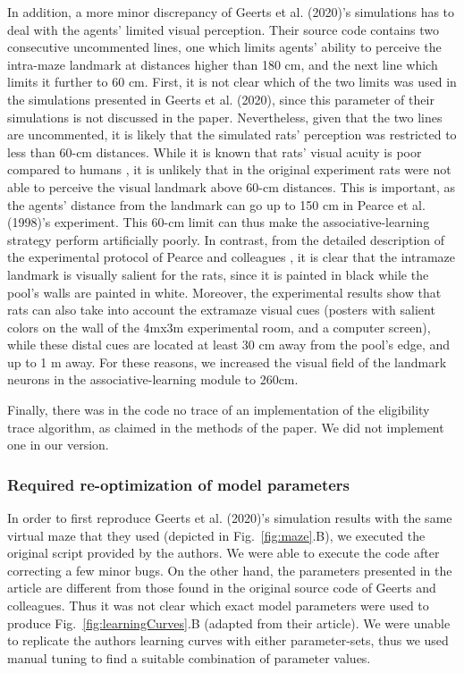 In addition, a more minor discrepancy of Geerts et al. (2020)'s simulations has to deal with the agents' limited visual perception. Their source code contains two consecutive uncommented lines, one which limits agents' ability to perceive the intra-maze landmark at distances higher than 180 cm, and the next line which limits it further to 60 cm. First, it is not clear which of the two limits was used in the simulations presented in Geerts et al. (2020), since this parameter of their simulations is not discussed in the paper. Nevertheless, given that the two lines are uncommented, it is likely that the simulated rats' perception was restricted to less than 60-cm distances. While it is known that rats' visual acuity is poor compared to humans \citep{caves2018}, it is unlikely that in the original experiment rats were not able to perceive the visual landmark above 60-cm distances. This is important, as the agents' distance from the landmark can go up to 150 cm in Pearce et al. (1998)'s experiment. This 60-cm limit can thus make the associative-learning strategy perform artificially poorly. In contrast, from the detailed description of the experimental protocol of Pearce and colleagues \citep{roberts1998}, it is clear that the intramaze landmark is visually salient for the rats, since it is painted in black while the pool's walls are painted in white. Moreover, the experimental results show that rats can also take into account the extramaze visual cues (posters with salient colors on the wall of the 4mx3m experimental room, and a computer screen), while these distal cues are located at least 30 cm away from the pool's edge, and up to 1 m away. For these reasons, we increased the visual field of the landmark neurons in the associative-learning module to 260cm.

Finally, there was in the code no trace of an implementation of the eligibility trace algorithm, as claimed in the methods of the paper. We did not implement one in our version.

\subsubsection{Required re-optimization of model parameters}
In order to first reproduce Geerts et al. (2020)'s simulation results \citep{Geerts:2020} with the same virtual maze that they used (depicted in Fig.~\ref{fig:maze}.B), we executed the original script provided by the authors. We were able to execute the code after correcting a few minor bugs. 
On the other hand, the parameters presented in the article are different from those found in the original source code of Geerts and colleagues. Thus it was not clear which exact model parameters were used to produce Fig.~\ref{fig:learningCurves}.B (adapted from their article). We were unable to replicate the authors learning curves with either parameter-sets, thus we used manual tuning to find a suitable combination of parameter values.

